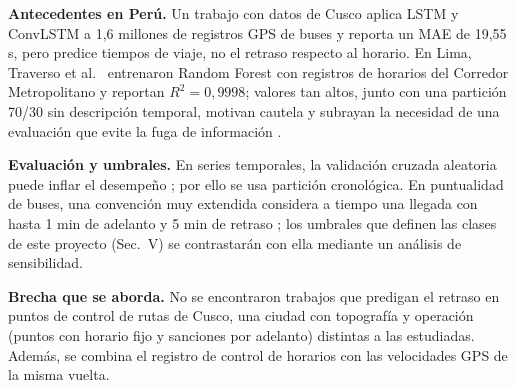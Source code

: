 \documentclass[conference,spanish]{IEEEtran}
\begin{document}
\textbf{Antecedentes en Perú.} Un trabajo con datos de Cusco \cite{cusco2024} aplica LSTM y ConvLSTM a 1,6 millones de registros GPS de buses y reporta un MAE de 19,55 s, pero predice tiempos de viaje, no el retraso respecto al horario. En Lima, Traverso et al.\ \cite{traverso2025} entrenaron Random Forest con registros de horarios del Corredor Metropolitano y reportan $R^2=0{,}9998$; valores tan altos, junto con una partición 70/30 sin descripción temporal, motivan cautela y subrayan la necesidad de una evaluación que evite la fuga de información \cite{kaufman2012}.

\textbf{Evaluación y umbrales.} En series temporales, la validación cruzada aleatoria puede inflar el desempeño \cite{bergmeir2012}; por ello se usa partición cronológica. En puntualidad de buses, una convención muy extendida considera a tiempo una llegada con hasta 1 min de adelanto y 5 min de retraso \cite{tcrp2003}; los umbrales que definen las clases de este proyecto (Sec.~V) se contrastarán con ella mediante un análisis de sensibilidad.

\textbf{Brecha que se aborda.} No se encontraron trabajos que predigan el retraso en puntos de control de rutas de Cusco, una ciudad con topografía y operación (puntos con horario fijo y sanciones por adelanto) distintas a las estudiadas. Además, se combina el registro de control de horarios con las velocidades GPS de la misma vuelta.
\end{document}
